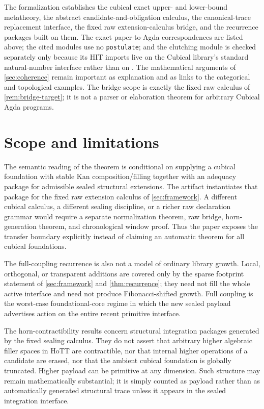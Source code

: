 \documentclass{lmcs}
\begin{document}
\begin{rem}
\label{rem:mech-scope}
The formalization establishes the cubical exact upper- and lower-bound metatheory, the abstract candidate-and-obligation calculus, the canonical-trace replacement interface, the fixed raw extension-calculus bridge, and the recurrence packages built on them. The exact paper-to-Agda correspondences are listed above; the cited modules use no \texttt{postulate}; and the clutching module is checked separately only because its HIT imports live on the Cubical library's standard natural-number interface rather than on . The mathematical arguments of \autoref{sec:coherence} remain important as explanation and as links to the categorical and topological examples. The bridge scope is exactly the fixed raw calculus of \autoref{rem:bridge-target}; it is not a parser or elaboration theorem for arbitrary Cubical Agda programs.
\end{rem}

\section{Scope and limitations}
\label{sec:limitations}

The semantic reading of the theorem is conditional on supplying a cubical
foundation with stable Kan composition/filling together with an adequacy package
for admissible sealed structural extensions. The artifact instantiates that
package for the fixed raw extension calculus of \autoref{sec:framework}. A
different cubical calculus, a different sealing discipline, or a richer raw
declaration grammar would require a separate normalization theorem, raw bridge,
horn-generation theorem, and chronological window proof. Thus the paper exposes
the transfer boundary explicitly instead of claiming an automatic theorem for
all cubical foundations.

The full-coupling recurrence is also not a model of ordinary library growth.
Local, orthogonal, or transparent additions are covered only by the sparse
footprint statement of \autoref{sec:framework} and
\autoref{thm:recurrence}; they need not fill the whole active interface and need
not produce Fibonacci-shifted growth. Full coupling is the worst-case
foundational-core regime in which the new sealed payload advertises action on the
entire recent primitive interface.

The horn-contractibility results concern structural integration packages
generated by the fixed sealing calculus. They do not assert that arbitrary
higher algebraic filler spaces in HoTT are contractible, nor that internal
higher operations of a candidate are erased, nor that the ambient cubical
foundation is globally truncated. Higher payload can be primitive at any
dimension. Such structure may remain mathematically substantial; it is simply
counted as payload rather than as automatically generated structural trace
unless it appears in the sealed integration interface.
\end{document}
